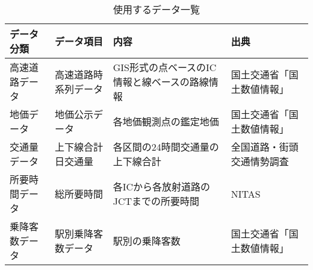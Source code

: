   \begin{table}[h!]
    \centering
    \renewcommand{\arraystretch}{1.2} %
    \begin{tabularx}{\textwidth}{p{} p{} p{} X}
    \toprule
    \textbf{データ分類}     &\textbf{データ項目}         & \textbf{内容}                                    & \textbf{出典}                   \\
    \midrule
    高速道路データ          &高速道路時系列データ         & GIS形式の点ベースのIC情報と線ベースの路線情報           & 国土交通省「国土数値情報」    \\
    地価データ             &地価公示データ              & 各地価観測点の鑑定地価                                & 国土交通省「国土数値情報」    \\
    交通量データ            &上下線合計日交通量           & 各区間の24時間交通量の上下線合計                       & 全国道路・街頭交通情勢調査              \\
    所要時間データ          &総所要時間                  & 各ICから各放射道路のJCTまでの所要時間                   & NITAS            \\
    乗降客数データ          &駅別乗降客数データ           &駅別の乗降客数                                         &国土交通省「国土数値情報」\\
    \bottomrule
    \end{tabularx}
    \caption{使用するデータ一覧}
    \label{data_list}
   \end{table}
  


